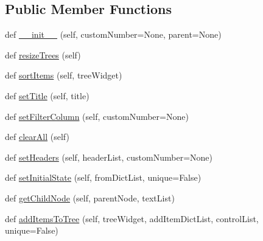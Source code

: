 \subsection*{Public Member Functions}
\begin{DoxyCompactItemize}
\item 
def \mbox{\hyperlink{class_dsg_tools_1_1_custom_widgets_1_1custom_table_selector_1_1_custom_table_selector_a071325782db3af7b33ef5d7c4f330ec7}{\+\_\+\+\_\+init\+\_\+\+\_\+}} (self, custom\+Number=None, parent=None)
\item 
def \mbox{\hyperlink{class_dsg_tools_1_1_custom_widgets_1_1custom_table_selector_1_1_custom_table_selector_af85287115718bf9b8747eb7385d70a7a}{resize\+Trees}} (self)
\item 
def \mbox{\hyperlink{class_dsg_tools_1_1_custom_widgets_1_1custom_table_selector_1_1_custom_table_selector_a4578d03da93bb096730737ce3058b426}{sort\+Items}} (self, tree\+Widget)
\item 
def \mbox{\hyperlink{class_dsg_tools_1_1_custom_widgets_1_1custom_table_selector_1_1_custom_table_selector_af12550c906f5410bb04613baa46b880a}{set\+Title}} (self, title)
\item 
def \mbox{\hyperlink{class_dsg_tools_1_1_custom_widgets_1_1custom_table_selector_1_1_custom_table_selector_acbfc7c0f716159e87006ce9c7fda6586}{set\+Filter\+Column}} (self, custom\+Number=None)
\item 
def \mbox{\hyperlink{class_dsg_tools_1_1_custom_widgets_1_1custom_table_selector_1_1_custom_table_selector_a2b433744fb735a74d20fb729bf188f6d}{clear\+All}} (self)
\item 
def \mbox{\hyperlink{class_dsg_tools_1_1_custom_widgets_1_1custom_table_selector_1_1_custom_table_selector_a5dafcf0c8a8e0ec2a15f4a454e0e4602}{set\+Headers}} (self, header\+List, custom\+Number=None)
\item 
def \mbox{\hyperlink{class_dsg_tools_1_1_custom_widgets_1_1custom_table_selector_1_1_custom_table_selector_a652d2b7bc88ffaa2fa68245381aa21df}{set\+Initial\+State}} (self, from\+Dict\+List, unique=False)
\item 
def \mbox{\hyperlink{class_dsg_tools_1_1_custom_widgets_1_1custom_table_selector_1_1_custom_table_selector_a3bc4894af63d0aac442960b7647bafb8}{get\+Child\+Node}} (self, parent\+Node, text\+List)
\item 
def \mbox{\hyperlink{class_dsg_tools_1_1_custom_widgets_1_1custom_table_selector_1_1_custom_table_selector_a28820966afdddb28abaa28306ff151a0}{add\+Items\+To\+Tree}} (self, tree\+Widget, add\+Item\+Dict\+List, control\+List, unique=False)

\end{DoxyCompactItemize}
